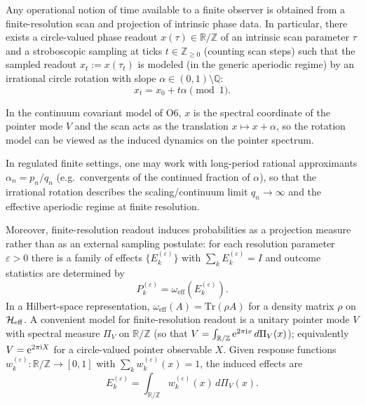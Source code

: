 \begin{axiom}
Any operational notion of time available to a finite observer is obtained from a finite-resolution scan and projection of intrinsic phase data. In particular, there exists a circle-valued phase readout $x(\tau)\in\mathbb{R}/\mathbb{Z}$ of an intrinsic scan parameter $\tau$ and a stroboscopic sampling at ticks $t\in\mathbb{Z}_{\ge 0}$ (counting scan steps) such that the sampled readout $x_t:=x(\tau_t)$ is modeled (in the generic aperiodic regime) by an irrational circle rotation with slope $\alpha\in(0,1)\setminus\mathbb{Q}$:
\begin{equation}
    x_t = x_0 + t\alpha \pmod{1}.
\end{equation}
\par
In the continuum covariant model of O6, $x$ is the spectral coordinate of the pointer mode $V$ and the scan acts as the translation $x\mapsto x+\alpha$, so the rotation model can be viewed as the induced dynamics on the pointer spectrum.
\par
In regulated finite settings, one may work with long-period rational approximants $\alpha_n=p_n/q_n$ (e.g.\ convergents of the continued fraction of $\alpha$), so that the irrational rotation describes the scaling/continuum limit $q_n\to\infty$ and the effective aperiodic regime at finite resolution.
\par
Moreover, finite-resolution readout induces probabilities as a projection measure rather than as an external sampling postulate: for each resolution parameter $\varepsilon>0$ there is a family of effects $\{E_k^{(\varepsilon)}\}$ with $\sum_k E_k^{(\varepsilon)}=I$ and outcome statistics are determined by
\begin{equation}
    P_k^{(\varepsilon)}=\omega_{\mathrm{eff}}\!\left(E_k^{(\varepsilon)}\right).
\end{equation}
In a Hilbert-space representation, $\omega_{\mathrm{eff}}(A)=\mathrm{Tr}(\rho A)$ for a density matrix $\rho$ on $\mathcal{H}_{\mathrm{eff}}$. A convenient model for finite-resolution readout is a unitary pointer mode $V$ with spectral measure $\Pi_V$ on $\mathbb{R}/\mathbb{Z}$ (so that $V=\int_{\mathbb{R}/\mathbb{Z}} \mathrm{e}^{2\pi \mathrm{i} x}\,d\Pi_V(x)$); equivalently $V=\mathrm{e}^{2\pi \mathrm{i} X}$ for a circle-valued pointer observable $X$. Given response functions $w_k^{(\varepsilon)}:\mathbb{R}/\mathbb{Z}\to[0,1]$ with $\sum_k w_k^{(\varepsilon)}(x)=1$, the induced effects are
\begin{equation}
    E_k^{(\varepsilon)}=\int_{\mathbb{R}/\mathbb{Z}} w_k^{(\varepsilon)}(x)\, d\Pi_V(x).

\end{equation}
\end{axiom}
